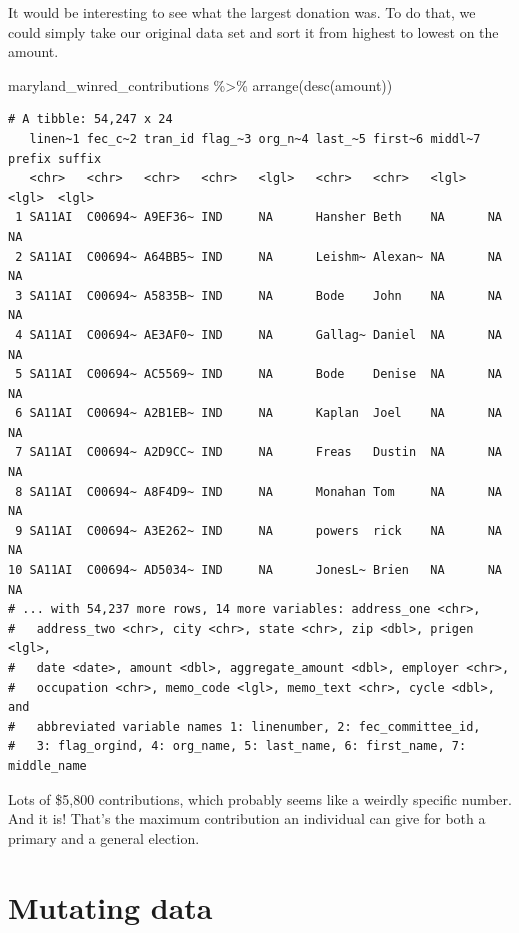 \documentclass[
  letterpaper,
  DIV=11,
  numbers=noendperiod]{scrreprt}
\newenvironment{Shaded}{\begin{snugshade}}{\end{snugshade}}
\newcommand{\FunctionTok}[1]{\textcolor[rgb]{0.28,0.35,0.67}{#1}}
\newcommand{\NormalTok}[1]{\textcolor[rgb]{0.00,0.23,0.31}{#1}}
\newcommand{\SpecialCharTok}[1]{\textcolor[rgb]{0.37,0.37,0.37}{#1}}
\begin{document}
It would be interesting to see what the largest donation was. To do
that, we could simply take our original data set and sort it from
highest to lowest on the amount.

\begin{Shaded}
\begin{Highlighting}[]
\NormalTok{maryland\_winred\_contributions }\SpecialCharTok{\%\textgreater{}\%}
  \FunctionTok{arrange}\NormalTok{(}\FunctionTok{desc}\NormalTok{(amount))}
\end{Highlighting}
\end{Shaded}

\begin{verbatim}
# A tibble: 54,247 x 24
   linen~1 fec_c~2 tran_id flag_~3 org_n~4 last_~5 first~6 middl~7 prefix suffix
   <chr>   <chr>   <chr>   <chr>   <lgl>   <chr>   <chr>   <lgl>   <lgl>  <lgl> 
 1 SA11AI  C00694~ A9EF36~ IND     NA      Hansher Beth    NA      NA     NA    
 2 SA11AI  C00694~ A64BB5~ IND     NA      Leishm~ Alexan~ NA      NA     NA    
 3 SA11AI  C00694~ A5835B~ IND     NA      Bode    John    NA      NA     NA    
 4 SA11AI  C00694~ AE3AF0~ IND     NA      Gallag~ Daniel  NA      NA     NA    
 5 SA11AI  C00694~ AC5569~ IND     NA      Bode    Denise  NA      NA     NA    
 6 SA11AI  C00694~ A2B1EB~ IND     NA      Kaplan  Joel    NA      NA     NA    
 7 SA11AI  C00694~ A2D9CC~ IND     NA      Freas   Dustin  NA      NA     NA    
 8 SA11AI  C00694~ A8F4D9~ IND     NA      Monahan Tom     NA      NA     NA    
 9 SA11AI  C00694~ A3E262~ IND     NA      powers  rick    NA      NA     NA    
10 SA11AI  C00694~ AD5034~ IND     NA      JonesL~ Brien   NA      NA     NA    
# ... with 54,237 more rows, 14 more variables: address_one <chr>,
#   address_two <chr>, city <chr>, state <chr>, zip <dbl>, prigen <lgl>,
#   date <date>, amount <dbl>, aggregate_amount <dbl>, employer <chr>,
#   occupation <chr>, memo_code <lgl>, memo_text <chr>, cycle <dbl>, and
#   abbreviated variable names 1: linenumber, 2: fec_committee_id,
#   3: flag_orgind, 4: org_name, 5: last_name, 6: first_name, 7: middle_name
\end{verbatim}

Lots of \$5,800 contributions, which probably seems like a weirdly
specific number. And it is! That's the maximum contribution an
individual can give for both a primary and a general election.


\hypertarget{mutating-data}{%
\chapter{Mutating data}\label{mutating-data}}
\end{document}
